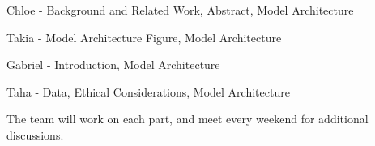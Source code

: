 \documentclass{article}
\begin{document}
Chloe - Background and Related Work, Abstract, Model Architecture

Takia - Model Architecture Figure, Model Architecture

Gabriel - Introduction, Model Architecture

Taha - Data, Ethical Considerations, Model Architecture

The team will work on each part, and meet every weekend for additional discussions. 


\end{document}

